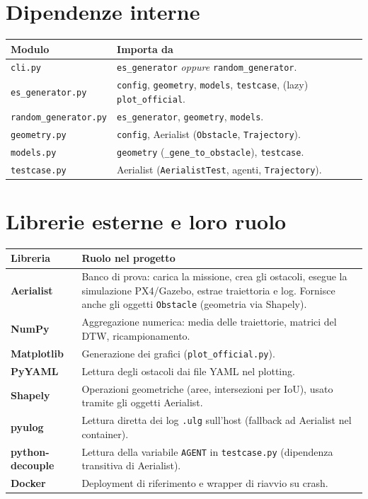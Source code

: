 \documentclass[11pt,a4paper]{report}
\newcommand{\code}[1]{\texttt{#1}}
\begin{document}
\section{Dipendenze interne}
\begin{longtable}{L{3.6cm} L{10.4cm}}
\toprule
\textbf{Modulo} & \textbf{Importa da}\\
\midrule
\endhead
\code{cli.py} & \code{es\_generator} \emph{oppure} \code{random\_generator}.\\
\code{es\_generator.py} & \code{config}, \code{geometry}, \code{models}, \code{testcase}, (lazy) \code{plot\_official}.\\
\code{random\_generator.py} & \code{es\_generator}, \code{geometry}, \code{models}.\\
\code{geometry.py} & \code{config}, Aerialist (\code{Obstacle}, \code{Trajectory}).\\
\code{models.py} & \code{geometry} (\code{\_gene\_to\_obstacle}), \code{testcase}.\\
\code{testcase.py} & Aerialist (\code{AerialistTest}, agenti, \code{Trajectory}).\\
\bottomrule
\end{longtable}

\section{Librerie esterne e loro ruolo}
\begin{longtable}{L{3.4cm} L{10.6cm}}
\toprule
\textbf{Libreria} & \textbf{Ruolo nel progetto}\\
\midrule
\endhead
\textbf{Aerialist} & Banco di prova: carica la missione, crea gli ostacoli, esegue la simulazione PX4/Gazebo, estrae traiettoria e log. Fornisce anche gli oggetti \code{Obstacle} (geometria via Shapely).\\
\textbf{NumPy} & Aggregazione numerica: media delle traiettorie, matrici del DTW, ricampionamento.\\
\textbf{Matplotlib} & Generazione dei grafici (\code{plot\_official.py}).\\
\textbf{PyYAML} & Lettura degli ostacoli dai file YAML nel plotting.\\
\textbf{Shapely} & Operazioni geometriche (aree, intersezioni per IoU), usato tramite gli oggetti Aerialist.\\
\textbf{pyulog} & Lettura diretta dei log \code{.ulg} sull'host (fallback ad Aerialist nel container).\\
\textbf{python-decouple} & Lettura della variabile \code{AGENT} in \code{testcase.py} (dipendenza transitiva di Aerialist).\\
\textbf{Docker} & Deployment di riferimento e wrapper di riavvio su crash.\\
\bottomrule
\end{longtable}
\end{document}
